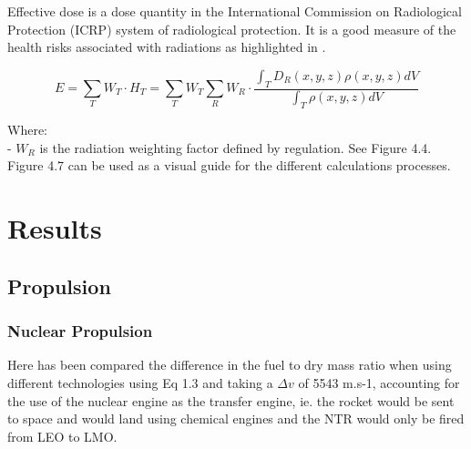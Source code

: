 \documentclass[12pt,a4paper]{report}
\begin{document}
\quad Effective dose is a dose quantity in the International Commission on Radiological Protection (ICRP) system of radiological protection. It is a good measure of the health risks associated with radiations as highlighted in \citet{protection2007icrp}.

\begin{equation}
E=\sum _{T}W_{T}\cdot H_{T}=\sum _{T}W_{T}\sum _{R}W_{R}\cdot {\frac {\displaystyle \int _{T}D_{R}(x,y,z)\rho (x,y,z)dV}{\displaystyle \int _{T}\rho (x,y,z)dV}}
\end{equation}

Where:\\
- $W_{R}$ is the radiation weighting factor defined by regulation. See Figure 4.4.\\

Figure 4.7 can be used as a visual guide for the different calculations processes.

\newpage

\chapter{Results}

\section{Propulsion}
\subsection{Nuclear Propulsion}
Here has been compared the difference in the fuel to dry mass ratio when using different technologies using Eq 1.3 and taking a $\Delta v$ of 5543 m.s-1, accounting for the use of the nuclear engine as the transfer engine, ie. the rocket would be sent to space and would land using chemical engines and the NTR would only be fired from LEO to LMO.

\vspace{.5cm}
\end{document}
